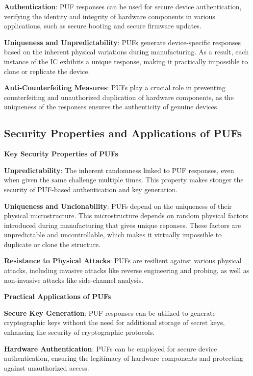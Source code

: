 \documentclass{article}
\begin{document}
\textbf{Authentication}: PUF responses can be used for secure device authentication, verifying the identity and integrity of hardware components in various applications, such as secure booting and secure firmware updates.

\textbf{Uniqueness and Unpredictability}: PUFs generate device-specific responses based on the inherent physical variations during manufacturing. As a result, each instance of the IC exhibits a unique response, making it practically impossible to clone or replicate the device.

\textbf{Anti-Counterfeiting Measures}: PUFs play a crucial role in preventing counterfeiting and unauthorized duplication of hardware components, as the uniqueness of the responses ensures the authenticity of genuine devices.


\subsection{Security Properties and Applications of PUFs}

\textbf{Key Security Properties of PUFs}

\textbf{Unpredictability}: The inherent randomness linked to  PUF responses, even when given the same challenge multiple times. This property makes stonger the security of PUF-based authentication and key generation.


\textbf{Uniqueness and Unclonability}: PUFs depend on the uniqueness of their physical microstructure. This microstructure depends on random physical factors introduced during manufacturing that gives unique reponses. These factors are unpredictable and uncontrollable, which makes it virtually impossible to duplicate or clone the structure.


\textbf{Resistance to Physical Attacks}: PUFs are resilient against various physical attacks, including invasive attacks like reverse engineering and probing, as well as non-invasive attacks like side-channel analysis.


\textbf{Practical Applications of PUFs}


\textbf{Secure Key Generation}: PUF responses can be utilized to generate cryptographic keys without the need for additional storage of secret keys, enhancing the security of cryptographic protocols.


\textbf{Hardware Authentication}: PUFs can be employed for secure device authentication, ensuring the legitimacy of hardware components and protecting against unauthorized access.
\end{document}
